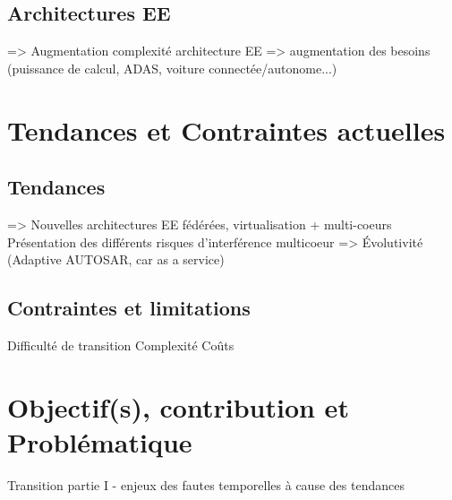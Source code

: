 \documentclass[french, a4paper, 11pt, twoside, pdftex]{StyleThese}
\begin{document}
    \subsection*{Architectures EE}
        => Augmentation complexité architecture EE
        => augmentation des besoins (puissance de calcul, ADAS, voiture connectée/autonome...)
\section*{Tendances et Contraintes actuelles}
    \subsection*{Tendances}
        => Nouvelles architectures EE fédérées, virtualisation + multi-coeurs
            Présentation des différents risques d'interférence multicoeur
        => Évolutivité (Adaptive AUTOSAR, car as a service)
    \subsection*{Contraintes et limitations}
        Difficulté de transition
        Complexité
        Coûts
\section*{Objectif(s), contribution et Problématique}
    Transition partie I - enjeux des fautes temporelles à cause des tendances

\ifdefined{}
\else


\end{document}
